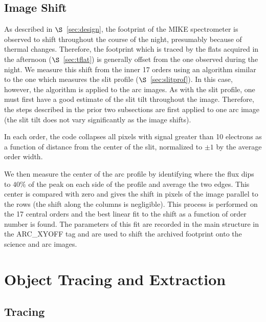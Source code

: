 \documentclass[12pt,preprint]{aastex}
\begin{document}
\subsection{Image Shift}
\label{sec:shift}

As described in $\S$~\ref{sec:design}, the footprint of the
MIKE spectrometer is observed to shift throughout the course
of the night, presumably because of thermal changes. 
Therefore, the footprint which is traced by the
flats acquired in the afternoon ($\S$~\ref{sec:tflat})
is generally offset from the one observed during the night.
We measure this shift from the inner 17 orders using
an algorithm similar to the one which measures the slit
profile ($\S$~\ref{sec:slitprof}).  In this case, however,
the algorithm is applied to the arc images.  As with the slit
profile, one must first have a good estimate of the slit
tilt throughout the image.  Therefore, the steps described in
the prior two subsections are first applied to one arc image
(the slit tilt does not vary significantly as the image shifts).

In each order,  the code collapses all pixels
with signal greater than 10 electrons as a function of 
distance from the center of the slit, normalized to
$\pm 1$ by the average order width.  

We then measure the
center of the arc profile by identifying where the flux
dips to $40\%$ of the peak on each side of the profile
and average the two edges.  This center is compared with
zero and gives the shift in pixels of the image parallel
to the rows (the shift along the columns is negligible).
This process is performed on the 17 central orders and the best
linear fit to the shift as a function of order number is found.  
The parameters of this fit are recorded in the main structure 
in the ARC\_XYOFF tag and are
used to shift the archived footprint onto the science and
arc images.

%

 
\section{Object Tracing and Extraction}
\label{sec:object}

\subsection{Tracing}
\end{document}
